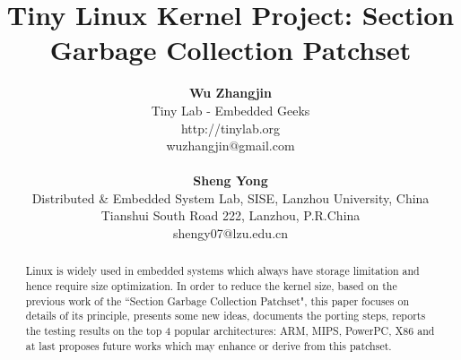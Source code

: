 \documentclass[10pt,a4paper]{article}
\title{\LARGE
Tiny Linux Kernel Project: Section Garbage Collection Patchset
}
\author{\large
{\bf Wu Zhangjin}\\
Tiny Lab - Embedded Geeks\\
http://tinylab.org\\
wuzhangjin$@$gmail.com \\
		\\
{\bf Sheng Yong}\\
Distributed \& Embedded System Lab, SISE, Lanzhou University, China\\
Tianshui South Road 222, Lanzhou, P.R.China\\
\vspace{8mm}
shengy07$@$lzu.edu.cn\\
}
\date{}
\begin{document}
\maketitle

\begin{abstract}

Linux is widely used in embedded systems which always have storage limitation
and hence require size optimization. In order to reduce the kernel size, based
on the previous work of the ``Section Garbage Collection Patchset", this paper
focuses on details of its principle, presents some new ideas, documents the
porting steps, reports the testing results on the top 4 popular architectures:
ARM, MIPS, PowerPC, X86 and at last proposes future works which may enhance or
derive from this patchset.

\end{abstract}

\vspace{10mm}
\end{document}

